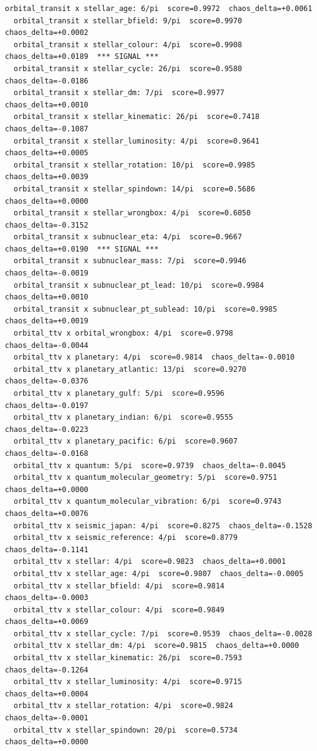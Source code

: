 \documentclass[11pt, letterpaper, openany]{book}
\begin{document}
\begin{empiricalbox}
\begin{lstlisting}[style=terminal]
  orbital_transit x stellar_age: 6/pi  score=0.9972  chaos_delta=+0.0061
  orbital_transit x stellar_bfield: 9/pi  score=0.9970  chaos_delta=+0.0002
  orbital_transit x stellar_colour: 4/pi  score=0.9908  chaos_delta=+0.0189  *** SIGNAL ***
  orbital_transit x stellar_cycle: 26/pi  score=0.9580  chaos_delta=-0.0186
  orbital_transit x stellar_dm: 7/pi  score=0.9977  chaos_delta=+0.0010
  orbital_transit x stellar_kinematic: 26/pi  score=0.7418  chaos_delta=-0.1087
  orbital_transit x stellar_luminosity: 4/pi  score=0.9641  chaos_delta=+0.0005
  orbital_transit x stellar_rotation: 10/pi  score=0.9985  chaos_delta=+0.0039
  orbital_transit x stellar_spindown: 14/pi  score=0.5686  chaos_delta=+0.0000
  orbital_transit x stellar_wrongbox: 4/pi  score=0.6050  chaos_delta=-0.3152
  orbital_transit x subnuclear_eta: 4/pi  score=0.9667  chaos_delta=+0.0190  *** SIGNAL ***
  orbital_transit x subnuclear_mass: 7/pi  score=0.9946  chaos_delta=-0.0019
  orbital_transit x subnuclear_pt_lead: 10/pi  score=0.9984  chaos_delta=+0.0010
  orbital_transit x subnuclear_pt_sublead: 10/pi  score=0.9985  chaos_delta=+0.0019
  orbital_ttv x orbital_wrongbox: 4/pi  score=0.9798  chaos_delta=-0.0044
  orbital_ttv x planetary: 4/pi  score=0.9814  chaos_delta=-0.0010
  orbital_ttv x planetary_atlantic: 13/pi  score=0.9270  chaos_delta=-0.0376
  orbital_ttv x planetary_gulf: 5/pi  score=0.9596  chaos_delta=-0.0197
  orbital_ttv x planetary_indian: 6/pi  score=0.9555  chaos_delta=-0.0223
  orbital_ttv x planetary_pacific: 6/pi  score=0.9607  chaos_delta=-0.0168
  orbital_ttv x quantum: 5/pi  score=0.9739  chaos_delta=-0.0045
  orbital_ttv x quantum_molecular_geometry: 5/pi  score=0.9751  chaos_delta=+0.0000
  orbital_ttv x quantum_molecular_vibration: 6/pi  score=0.9743  chaos_delta=+0.0076
  orbital_ttv x seismic_japan: 4/pi  score=0.8275  chaos_delta=-0.1528
  orbital_ttv x seismic_reference: 4/pi  score=0.8779  chaos_delta=-0.1141
  orbital_ttv x stellar: 4/pi  score=0.9823  chaos_delta=+0.0001
  orbital_ttv x stellar_age: 4/pi  score=0.9807  chaos_delta=-0.0005
  orbital_ttv x stellar_bfield: 4/pi  score=0.9814  chaos_delta=-0.0003
  orbital_ttv x stellar_colour: 4/pi  score=0.9849  chaos_delta=+0.0069
  orbital_ttv x stellar_cycle: 7/pi  score=0.9539  chaos_delta=-0.0028
  orbital_ttv x stellar_dm: 4/pi  score=0.9815  chaos_delta=+0.0000
  orbital_ttv x stellar_kinematic: 26/pi  score=0.7593  chaos_delta=-0.1264
  orbital_ttv x stellar_luminosity: 4/pi  score=0.9715  chaos_delta=+0.0004
  orbital_ttv x stellar_rotation: 4/pi  score=0.9824  chaos_delta=-0.0001
  orbital_ttv x stellar_spindown: 20/pi  score=0.5734  chaos_delta=+0.0000

\end{lstlisting}
\end{empiricalbox}
\end{document}
